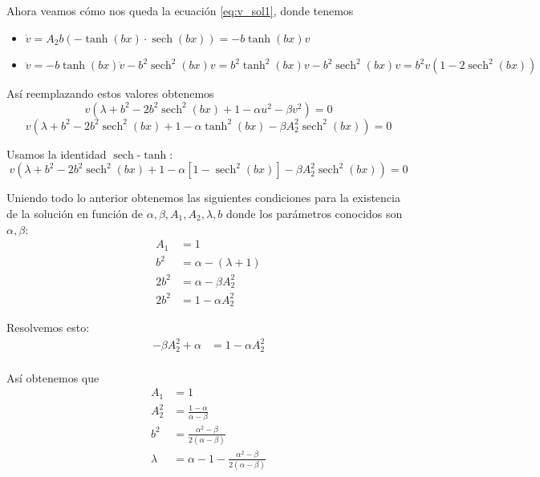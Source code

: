 \documentclass[letterpaper,11pt]{exam}
\newcommand{\sech}{\operatorname{sech}}
\theoremstyle{plain}
\begin{document}
Ahora veamos cómo nos queda la ecuación \eqref{eq:v_sol1}, donde tenemos
\begin{itemize}
    \item $\dot{v}=A_2b(-\tanh(bx)\cdot \sech(bx))=-b\tanh(bx)v$
    \item $\ddot{v}=-b\tanh(bx)\dot{v}-b^2\sech^2(bx)v=b^2\tanh^2(bx)v-b^2\sech^2(bx)v=b^2v(1-2\sech^2(bx))$
\end{itemize}

Así reemplazando estos valores obtenemos
\begin{equation*}
    v(\lambda +b^2-2b^2\sech^2(bx)+1-\alpha u^2-\beta v^2)=0
\end{equation*}
\begin{equation*}
    v(\lambda +b^2-2b^2\sech^2(bx)+1-\alpha\tanh^2(bx)-\beta A_2^2\sech^2(bx))=0
\end{equation*}

Usamos la identidad $\sech$-$\tanh$:
\begin{equation*}
    v(\lambda +b^2-2b^2\sech^2(bx)+1-\alpha[1-\sech^2(bx)]-\beta A_2^2\sech^2(bx))=0
\end{equation*}

Uniendo todo lo anterior obtenemos las siguientes condiciones para la existencia de la solución en función de $\alpha,\beta, A_1,A_2, \lambda, b$ donde los parámetros conocidos son $\alpha,\beta$:
\begin{align*}
A_1&=1\\
b^2&=\alpha-(\lambda+1)\\
2b^2&= \alpha - \beta A_2^2 \\
2b^2&=1-\alpha A_2^2
\end{align*}

Resolvemos esto:
\begin{align*}
    -\beta A_2^2 + \alpha&=1-\alpha A_2^2 \\
\end{align*}

Así obtenemos que
\begin{align*}
    A_1&=1 \\
    A_2^2&=\frac{1-\alpha}{\alpha-\beta} \\
    b^2&=\frac{\alpha^2-\beta}{2(\alpha-\beta)} \\
    \lambda&=\alpha -1-\frac{\alpha^2-\beta}{2(\alpha-\beta)}
\end{align*}
\end{document}
